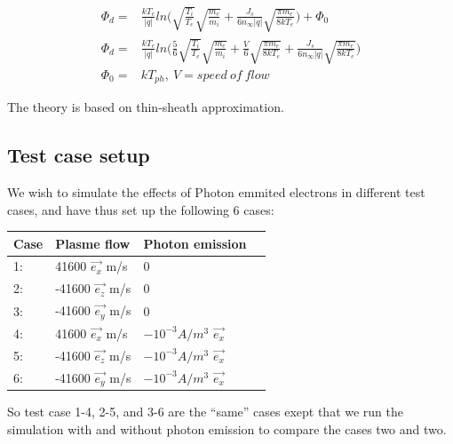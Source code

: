 \begin{equation}
\begin{split}
 \Phi_d = & \frac{k T_e}{|q|}ln\Big(\sqrt{\frac{T_i}{T_e}}\sqrt{\frac{m_e}{m_i}}+\frac{J_s}{6 n_\infty |q|}\sqrt{\frac{\pi m_e}{8 k T_e}}\Big) + \Phi_0 \\
 \Phi_d = & \frac{k T_e}{|q|}ln\Big(\frac{5}{6}\sqrt{\frac{T_i}{T_e}}\sqrt{\frac{m_e}{m_i}}+\frac{V}{6}\sqrt{\frac{\pi m_e}{8 k T_e}} + \frac{J_s}{6 n_\infty |q|}\sqrt{\frac{\pi m_e}{8 k T_e}} \Big) \\
 \Phi_0 = & k T_{ph}, \ V = speed\ of\ flow
\end{split}
\label{thin sheet potential 2} 
\end{equation}

The theory is based on thin-sheath approximation.

\subsection{Test case setup}

We wish to simulate the effects of Photon emmited electrons in different test cases, and have thus set up the following
6 cases:
\begin{center}
    \begin{tabular}{ | l | l | l | p{5cm} |}
    \hline
    Case & Plasme flow & Photon emission  \\ \hline
     1: & 41600 $\vec{e_x}$ m/s  & 0 \\ \hline
     2: & -41600 $\vec{e_z}$ m/s & 0 \\ \hline
     3: & -41600 $\vec{e_y}$ m/s & 0 \\ \hline
     4: & 41600 $\vec{e_x}$ m/s & $-10^{-3} A/m^{3}$ $\vec{e_x}$\\ \hline
     5: & -41600 $\vec{e_z}$ m/s & $-10^{-3} A/m^{3}$ $\vec{e_x}$\\ \hline
     6: & -41600 $\vec{e_y}$ m/s & $-10^{-3} A/m^{3}$  $\vec{e_x}$\\
    \hline
    \end{tabular}
\end{center}

So test case 1-4, 2-5, and 3-6 are the ``same'' cases exept that we run the simulation with and without
photon emission to compare the cases two and two. 

